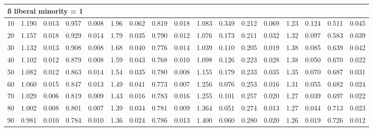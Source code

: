 \documentclass[
]{article}
\begin{document}
\begin{table}[H]
\begin{table}
{\begin{tabular}{r|r|r|r|r|r|r|r|r|r|r|r|r|r|r|r|r}
\hline
\multicolumn{17}{l}{\textbf{ß liberal minority = 1}}\\
\hline
\hspace{1em}10 & 1.190 & 0.013 & 0.957 & 0.008 & 1.96 & 0.062 & 0.819 & 0.018 & 1.083 & 0.349 & 0.212 & 0.069 & 1.23 & 0.124 & 0.511 & 0.045\\
\hline
\hspace{1em}20 & 1.157 & 0.018 & 0.929 & 0.014 & 1.79 & 0.035 & 0.790 & 0.012 & 1.076 & 0.173 & 0.211 & 0.032 & 1.32 & 0.097 & 0.583 & 0.039\\
\hline
\hspace{1em}30 & 1.132 & 0.013 & 0.908 & 0.008 & 1.68 & 0.040 & 0.776 & 0.014 & 1.039 & 0.110 & 0.205 & 0.019 & 1.38 & 0.085 & 0.639 & 0.042\\
\hline
\hspace{1em}40 & 1.102 & 0.012 & 0.879 & 0.008 & 1.59 & 0.043 & 0.768 & 0.010 & 1.098 & 0.126 & 0.223 & 0.028 & 1.38 & 0.050 & 0.670 & 0.022\\
\hline
\hspace{1em}50 & 1.082 & 0.012 & 0.863 & 0.014 & 1.54 & 0.035 & 0.780 & 0.008 & 1.155 & 0.179 & 0.233 & 0.035 & 1.35 & 0.070 & 0.687 & 0.031\\
\hline
\hspace{1em}60 & 1.060 & 0.015 & 0.847 & 0.013 & 1.49 & 0.041 & 0.773 & 0.007 & 1.256 & 0.076 & 0.253 & 0.016 & 1.31 & 0.055 & 0.682 & 0.024\\
\hline
\hspace{1em}70 & 1.029 & 0.006 & 0.819 & 0.009 & 1.43 & 0.016 & 0.783 & 0.016 & 1.255 & 0.101 & 0.257 & 0.020 & 1.27 & 0.039 & 0.697 & 0.022\\
\hline
\hspace{1em}80 & 1.002 & 0.008 & 0.801 & 0.007 & 1.39 & 0.034 & 0.781 & 0.009 & 1.364 & 0.051 & 0.274 & 0.013 & 1.27 & 0.044 & 0.713 & 0.023\\
\hline
\hspace{1em}90 & 0.981 & 0.010 & 0.784 & 0.010 & 1.36 & 0.024 & 0.786 & 0.013 & 1.400 & 0.060 & 0.280 & 0.020 & 1.26 & 0.019 & 0.726 & 0.012\\
\hline
\end{tabular}}
\end{table}
\end{table}
\end{document}
